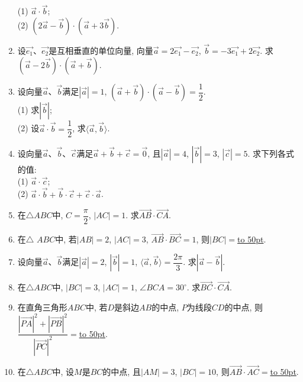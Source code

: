 \documentclass[10pt,a4paper]{article}
\newcommand{\blank}[1]{\underline{\hbox to #1pt{}}}
\begin{document}
\begin{enumerate}[1.]
(1) $\overrightarrow a\cdot \overrightarrow b$;\\
(2) $(2\overrightarrow a-\overrightarrow b)\cdot (\overrightarrow a+3\overrightarrow b)$.
\item 设$\overrightarrow{e_1}$、$\overrightarrow{e_2}$是互相垂直的单位向量, 向量$\overrightarrow a=2\overrightarrow{e_1}-\overrightarrow{e_2}$, $\overrightarrow b=-3\overrightarrow{e_1}+2\overrightarrow {e_2}$. 求$(\overrightarrow a-2\overrightarrow b)\cdot (\overrightarrow a+\overrightarrow b)$.
\item 设向量$\overrightarrow a$、$\overrightarrow b$满足$|\overrightarrow a|=1$, $(\overrightarrow a+\overrightarrow b)\cdot 
(\overrightarrow a-\overrightarrow b)=\dfrac 12$.\\
(1) 求$|\overrightarrow b|$;\\
(2) 设$\overrightarrow a\cdot \overrightarrow b=\dfrac 12$, 求$\langle \overrightarrow a, \overrightarrow b\rangle$.
\item 设向量$\overrightarrow a$、$\overrightarrow b$、$\overrightarrow c$满足$\overrightarrow a+\overrightarrow b+\overrightarrow c=\overrightarrow 0$, 且$|\overrightarrow a|=4$, $|\overrightarrow b|=3$, $|\overrightarrow c|=5$. 求下列各式的值:\\
(1) $\overrightarrow a\cdot \overrightarrow c$;\\
(2) $\overrightarrow a\cdot \overrightarrow b+\overrightarrow b\cdot \overrightarrow c+\overrightarrow c\cdot \overrightarrow a$.
\item 在$\triangle ABC$中, $C=\dfrac \pi 2$,  $|AC|=1$. 求$\overrightarrow{AB}\cdot \overrightarrow{CA}$.
\item 在$\triangle$ $ABC$中, 若$|AB|=2$, $|AC|=3$, $\overrightarrow{AB}\cdot \overrightarrow{BC}=1$, 则$|BC|=$\blank{50}.
\item 设向量$\overrightarrow a$、$\overrightarrow b$满足$|\overrightarrow a|=2$, $|\overrightarrow b|=1$, $\langle \overrightarrow a, \overrightarrow b\rangle =\dfrac{2\pi} 3$. 求$|\overrightarrow a-\overrightarrow b|$.
\item 在$\triangle ABC$中, $|BC|=3$, $|AC|=1$, $\angle BCA=30^\circ$. 求$\overrightarrow{BC}\cdot \overrightarrow{CA}$.
\item 在直角三角形$ABC$中, 若$D$是斜边$AB$的中点, $P$为线段$CD$的中点, 则$\dfrac{|\overrightarrow{PA}|^2+|\overrightarrow{PB}|^2}{|\overrightarrow{PC}|^2}=$\blank{50}.
\item 在$\triangle ABC$中, 设$M$是$BC$的中点, 且$|AM|=3$, $|BC|=10$, 则$\overrightarrow{AB}\cdot \overrightarrow{AC}=$\blank{50}.

\end{enumerate}
\end{document}
